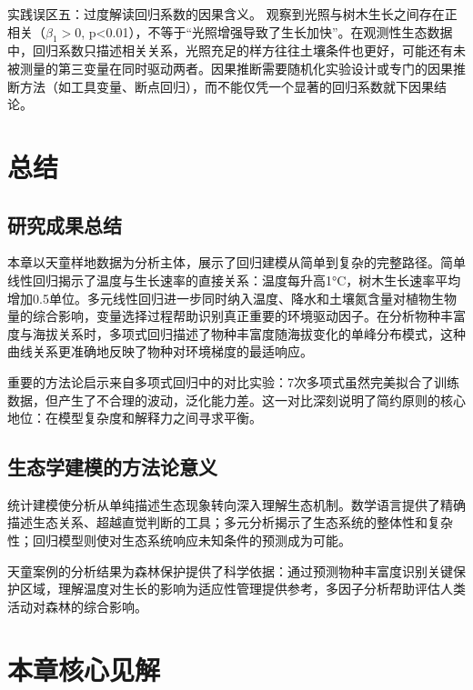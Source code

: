 \documentclass[
  twoside,12pt,fontset=none]{ctexbook}
\begin{document}
实践误区五：过度解读回归系数的因果含义。 观察到光照与树木生长之间存在正相关（\(\beta_1>0\), p\textless0.01），不等于``光照增强导致了生长加快''。在观测性生态数据中，回归系数只描述相关关系，光照充足的样方往往土壤条件也更好，可能还有未被测量的第三变量在同时驱动两者。因果推断需要随机化实验设计或专门的因果推断方法（如工具变量、断点回归），而不能仅凭一个显著的回归系数就下因果结论。

\hypertarget{ux603bux7ed3-7}{%
\section{总结}\label{ux603bux7ed3-7}}

\hypertarget{ux7814ux7a76ux6210ux679cux603bux7ed3}{%
\subsection{研究成果总结}\label{ux7814ux7a76ux6210ux679cux603bux7ed3}}

本章以天童样地数据为分析主体，展示了回归建模从简单到复杂的完整路径。简单线性回归揭示了温度与生长速率的直接关系：温度每升高1°C，树木生长速率平均增加0.5单位。多元线性回归进一步同时纳入温度、降水和土壤氮含量对植物生物量的综合影响，变量选择过程帮助识别真正重要的环境驱动因子。在分析物种丰富度与海拔关系时，多项式回归描述了物种丰富度随海拔变化的单峰分布模式，这种曲线关系更准确地反映了物种对环境梯度的最适响应。

重要的方法论启示来自多项式回归中的对比实验：7次多项式虽然完美拟合了训练数据，但产生了不合理的波动，泛化能力差。这一对比深刻说明了简约原则的核心地位：在模型复杂度和解释力之间寻求平衡。

\hypertarget{ux751fux6001ux5b66ux5efaux6a21ux7684ux65b9ux6cd5ux8bbaux610fux4e49}{%
\subsection{生态学建模的方法论意义}\label{ux751fux6001ux5b66ux5efaux6a21ux7684ux65b9ux6cd5ux8bbaux610fux4e49}}

统计建模使分析从单纯描述生态现象转向深入理解生态机制。数学语言提供了精确描述生态关系、超越直觉判断的工具；多元分析揭示了生态系统的整体性和复杂性；回归模型则使对生态系统响应未知条件的预测成为可能。

天童案例的分析结果为森林保护提供了科学依据：通过预测物种丰富度识别关键保护区域，理解温度对生长的影响为适应性管理提供参考，多因子分析帮助评估人类活动对森林的综合影响。

\hypertarget{ux672cux7ae0ux6838ux5fc3ux89c1ux89e3-6}{%
\section{本章核心见解}\label{ux672cux7ae0ux6838ux5fc3ux89c1ux89e3-6}}
\end{document}
